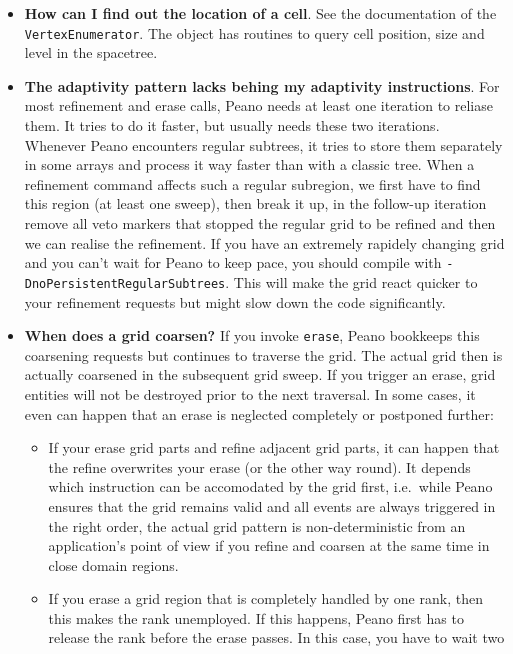 \begin{itemize}
  \item \textbf{ How can I find out the location of a cell}. See the
  documentation of the \texttt{VertexEnumerator}. The object has routines to query cell
  position, size and level in the spacetree.
  \item \textbf{ The adaptivity pattern lacks behing my adaptivity
  instructions}.
  For most refinement and erase calls, Peano needs at least one iteration to
  reliase them. It tries to do it faster, but usually needs these two
  iterations. Whenever Peano encounters regular subtrees, it tries to store 
  them separately in some arrays and process it way faster than with a classic
  tree. When a refinement command affects such a regular subregion, we first 
  have to find this region (at least one sweep), then break it up, in the
  follow-up iteration remove all veto markers that stopped the regular grid to
  be refined and then we can realise the refinement. If you have an extremely
  rapidely changing grid and you can't wait for Peano to keep pace, you should
  compile with \texttt{-DnoPersistentRegularSubtrees}. This will make the grid
  react quicker to your refinement requests but might slow down the code
  significantly.
  \item \textbf{ When does a grid coarsen?} If you invoke \texttt{erase}, Peano
  bookkeeps this coarsening requests but continues to traverse the grid. The
  actual grid then is actually coarsened in the subsequent grid sweep. If you
  trigger an erase, grid entities will not be destroyed prior to the next
  traversal. In some cases, it even can happen that an erase is neglected
  completely or postponed further:
  \begin{itemize}
    \item If your erase grid parts and refine adjacent grid parts, it can happen
    that the refine overwrites your erase (or the other way round). It depends
    which instruction can be accomodated by the grid first, i.e.~while Peano
    ensures that the grid remains valid and all events are always triggered in
    the right order, the actual grid pattern is non-deterministic from an
    application's point of view if you refine and coarsen at the same time in
    close domain regions.
    \item If you erase a grid region that is completely handled by one rank,
    then this makes the rank unemployed. If this happens, Peano first has to
    release the rank before the erase passes. In this case, you have to wait two

\end{itemize}
\end{itemize}
